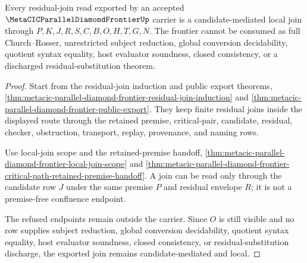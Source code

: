 \begin{theorem}
\label{thm:metacic-parallel-diamond-frontier-join-nonescape}
Every residual-join read exported by an accepted $\MetaCICParallelDiamondFrontierUp$ carrier is a candidate-mediated local join through $P,K,J,R,S,C,B,O,H,T,G,N$. The frontier cannot be consumed as full Church--Rosser, unrestricted subject reduction, global conversion decidability, quotient syntax equality, host evaluator soundness, closed consistency, or a discharged residual-substitution theorem.
\end{theorem}
\begin{proof}
Start from the residual-join induction and public export theorems, \autoref{thm:metacic-parallel-diamond-frontier-residual-join-induction} and \autoref{thm:metacic-parallel-diamond-frontier-public-export}. They keep finite residual joins inside the displayed route through the retained premise, critical-pair, candidate, residual, checker, obstruction, transport, replay, provenance, and naming rows.

Use local-join scope and the retained-premise handoff, \autoref{thm:metacic-parallel-diamond-frontier-local-join-scope} and \autoref{thm:metacic-parallel-diamond-frontier-critical-path-retained-premise-handoff}. A join can be read only through the candidate row $J$ under the same premise $P$ and residual envelope $R$; it is not a premise-free confluence endpoint.

The refused endpoints remain outside the carrier. Since $O$ is still visible and no row supplies subject reduction, global conversion decidability, quotient syntax equality, host evaluator soundness, closed consistency, or residual-substitution discharge, the exported join remains candidate-mediated and local.
\end{proof}
